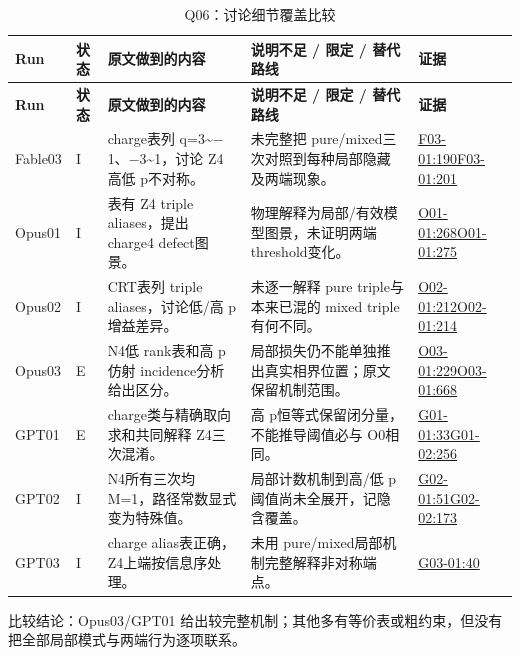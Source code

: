 \documentclass[11pt,a4paper]{article}
\begin{document}
{\fontsize{9.0}{12.6}\selectfont
\setlength{\tabcolsep}{2.5pt}
\begin{longtable}{>{\raggedright\arraybackslash}p{}>{\raggedright\arraybackslash}p{}>{\raggedright\arraybackslash}p{}>{\raggedright\arraybackslash}p{}>{\raggedright\arraybackslash}p{}}
\caption{Q06：讨论细节覆盖比较}\\
\toprule
\textbf{Run} & \textbf{状态} & \textbf{原文做到的内容} & \textbf{说明不足 / 限定 / 替代路线} & \textbf{证据}\tabularnewline
\midrule
\endfirsthead
\toprule
\textbf{Run} & \textbf{状态} & \textbf{原文做到的内容} & \textbf{说明不足 / 限定 / 替代路线} & \textbf{证据}\tabularnewline
\midrule
\endhead
{}Fable03 & I & charge表列 q=3\textasciitilde{}\ensuremath{-}1、\ensuremath{-}3\textasciitilde{}1，讨论 Z4高低 p不对称。 & 未完整把 pure/mixed三次对照到每种局部隐藏及两端现象。 & \hyperref[src:F03-01]{F03-01:190}\newline \hyperref[src:F03-01]{F03-01:201}\tabularnewline
{}Opus01 & I & 表有 Z4 triple aliases，提出 charge4 defect图景。 & 物理解释为局部/有效模型图景，未证明两端threshold变化。 & \hyperref[src:O01-01]{O01-01:268}\newline \hyperref[src:O01-01]{O01-01:275}\tabularnewline
{}Opus02 & I & CRT表列 triple aliases，讨论低/高 p增益差异。 & 未逐一解释 pure triple与本来已混的 mixed triple有何不同。 & \hyperref[src:O02-01]{O02-01:212}\newline \hyperref[src:O02-01]{O02-01:214}\tabularnewline
{}Opus03 & E & N4低 rank表和高 p仿射 incidence分析给出区分。 & 局部损失仍不能单独推出真实相界位置；原文保留机制范围。 & \hyperref[src:O03-01]{O03-01:229}\newline \hyperref[src:O03-01]{O03-01:668}\tabularnewline
{}GPT01 & E & charge类与精确取向求和共同解释 Z4三次混淆。 & 高 p恒等式保留闭分量，不能推导阈值必与 O0相同。 & \hyperref[src:G01-01]{G01-01:33}\newline \hyperref[src:G01-02]{G01-02:256}\tabularnewline
{}GPT02 & I & N4所有三次均 M=1，路径常数显式变为特殊值。 & 局部计数机制到高/低 p阈值尚未全展开，记隐含覆盖。 & \hyperref[src:G02-01]{G02-01:51}\newline \hyperref[src:G02-02]{G02-02:173}\tabularnewline
{}GPT03 & I & charge alias表正确，Z4上端按信息序处理。 & 未用 pure/mixed局部机制完整解释非对称端点。 & \hyperref[src:G03-01]{G03-01:40}\tabularnewline
\bottomrule
\end{longtable}
}
比较结论：Opus03/GPT01 给出较完整机制；其他多有等价表或粗约束，但没有把全部局部模式与两端行为逐项联系。
\end{document}
